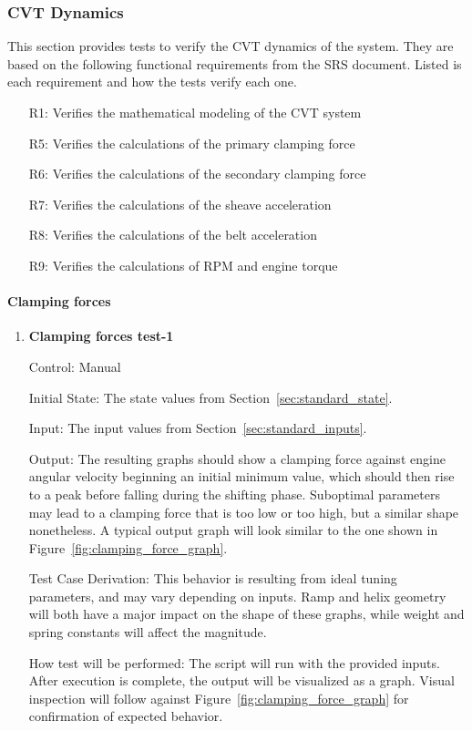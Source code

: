 \documentclass[12pt, titlepage]{article}
\begin{document}
\subsubsection{CVT Dynamics}

This section provides tests to verify the CVT dynamics of the system.
They are based on the following functional requirements from the SRS document.
Listed is each requirement and how the tests verify each one.
\begin{itemize}
  \item [R1:] Verifies the mathematical modeling of the CVT system
  \item [R5:] Verifies the calculations of the primary clamping force
  \item [R6:] Verifies the calculations of the secondary clamping force
  \item [R7:] Verifies the calculations of the sheave acceleration
  \item [R8:] Verifies the calculations of the belt acceleration
  \item [R9:] Verifies the calculations of RPM and engine torque
\end{itemize}

\paragraph{Clamping forces}

\begin{enumerate}

  \item {} \hypertarget{Clamping forces test-1}{\textbf{Clamping forces test-1}} \label{Clamping forces test-1}
  
  Control: Manual
            
  Initial State: The state values from Section~\ref{sec:standard_state}.
  
  Input: The input values from Section~\ref{sec:standard_inputs}.
            
  Output: The resulting graphs should show a clamping force against engine angular velocity beginning an initial minimum value, which should then rise to a peak before falling during the shifting phase. Suboptimal parameters may lead to a clamping force that is too low or too high, but a similar shape nonetheless. A typical output graph will look similar to the one shown in Figure~\ref{fig:clamping_force_graph}.
  
  Test Case Derivation: This behavior is resulting from ideal tuning parameters, and may vary depending on inputs. Ramp and helix geometry will both have a major impact on the shape of these graphs, while weight and spring constants will affect the magnitude.
  
  How test will be performed: The script will run with the provided inputs. After execution is complete, the output will be visualized as a graph. Visual inspection will follow against Figure~\ref{fig:clamping_force_graph} for confirmation of expected behavior.
  
\end{enumerate}
\end{document}
